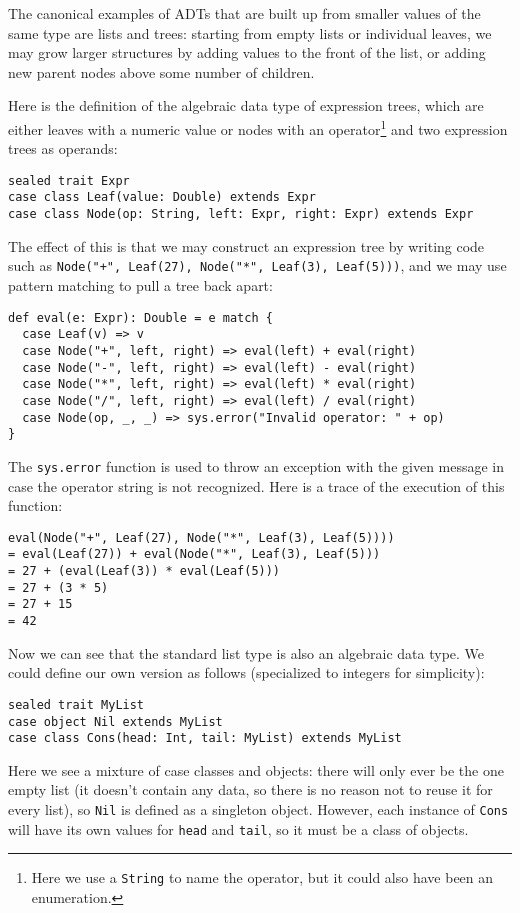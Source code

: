 The canonical examples of ADTs that are built up from smaller values of the same type are lists and trees: starting from empty lists or individual leaves, we may grow larger structures by adding values to the front of the list, or adding new parent nodes above some number of children.

Here is the definition of the algebraic data type of expression trees, which are either leaves with a numeric value or nodes with an operator\footnote{Here we use a \texttt{String} to name the operator, but it could also have been an enumeration.} and two expression trees as operands:
\begin{verbatim}
sealed trait Expr
case class Leaf(value: Double) extends Expr
case class Node(op: String, left: Expr, right: Expr) extends Expr
\end{verbatim}
The effect of this is that we may construct an expression tree by writing code such as \texttt{Node("+", Leaf(27), Node("*", Leaf(3), Leaf(5)))}, and we may use pattern matching to pull a tree back apart:
\begin{verbatim}
def eval(e: Expr): Double = e match {
  case Leaf(v) => v
  case Node("+", left, right) => eval(left) + eval(right)
  case Node("-", left, right) => eval(left) - eval(right)
  case Node("*", left, right) => eval(left) * eval(right)
  case Node("/", left, right) => eval(left) / eval(right)
  case Node(op, _, _) => sys.error("Invalid operator: " + op)
}
\end{verbatim}
The \texttt{sys.error} function is used to throw an exception with the given message in case the operator string is not recognized. Here is a trace of the execution of this function:
\begin{verbatim}
eval(Node("+", Leaf(27), Node("*", Leaf(3), Leaf(5))))
= eval(Leaf(27)) + eval(Node("*", Leaf(3), Leaf(5)))
= 27 + (eval(Leaf(3)) * eval(Leaf(5)))
= 27 + (3 * 5)
= 27 + 15
= 42
\end{verbatim}

Now we can see that the standard list type is also an algebraic data type. We could define our own version as follows (specialized to integers for simplicity):
\begin{verbatim}
sealed trait MyList
case object Nil extends MyList
case class Cons(head: Int, tail: MyList) extends MyList
\end{verbatim}
Here we see a mixture of case classes and objects: there will only ever be the one empty list (it doesn't contain any data, so there is no reason not to reuse it for every list), so \texttt{Nil} is defined as a singleton object. However, each instance of \texttt{Cons} will have its own values for \texttt{head} and \texttt{tail}, so it must be a class of objects.

